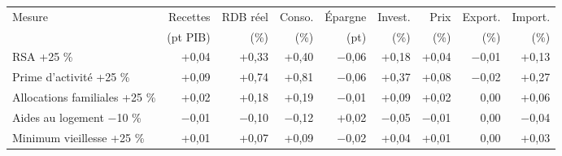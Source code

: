 \begin{tabular}{p{5.0cm}rrrrrrrr}
\toprule
Mesure & Recettes & RDB réel & Conso. & Épargne & Invest. & Prix & Export. & Import. \\
 & (pt PIB) & (\%) & (\%) & (pt) & (\%) & (\%) & (\%) & (\%) \\
\midrule
RSA +25 \% & +0{,}04 & +0{,}33 & +0{,}40 & $-$0{,}06 & +0{,}18 & +0{,}04 & $-$0{,}01 & +0{,}13 \\
Prime d'activité +25 \% & +0{,}09 & +0{,}74 & +0{,}81 & $-$0{,}06 & +0{,}37 & +0{,}08 & $-$0{,}02 & +0{,}27 \\
Allocations familiales +25 \% & +0{,}02 & +0{,}18 & +0{,}19 & $-$0{,}01 & +0{,}09 & +0{,}02 & 0{,}00 & +0{,}06 \\
Aides au logement −10 \% & $-$0{,}01 & $-$0{,}10 & $-$0{,}12 & +0{,}02 & $-$0{,}05 & $-$0{,}01 & 0{,}00 & $-$0{,}04 \\
Minimum vieillesse +25 \% & +0{,}01 & +0{,}07 & +0{,}09 & $-$0{,}02 & +0{,}04 & +0{,}01 & 0{,}00 & +0{,}03 \\
\bottomrule
\end{tabular}
